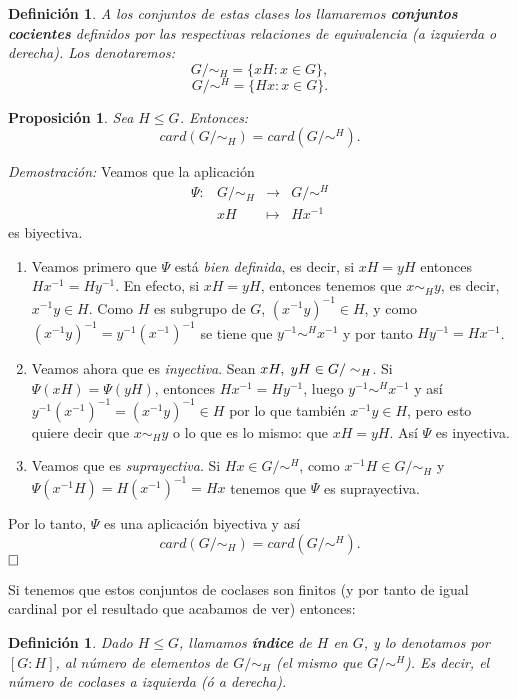 \documentclass[12pt]{article}
\newtheorem{proposition}[theorem]{Proposición}
\newtheorem{definition}[theorem]{Definición}
\begin{document}
\begin{definition}A los conjuntos de estas clases los llamaremos \textbf{conjuntos cocientes} definidos por las respectivas relaciones de equivalencia (a izquierda o derecha). Los denotaremos: $$G/\sim_{H} = \lbrace xH : x \in G \rbrace,$$ $$G/\sim^{H} = \lbrace Hx : x \in G \rbrace.$$
\end{definition}

\begin{proposition}
Sea $H \leq G$. Entonces:
$$card(G/\sim_{H})= card(G/\sim^{H}).$$
\end{proposition}
\emph{Demostración: } Veamos que la aplicación
$$
\begin{array}{rccl}
\Psi \colon &G/\sim_{H} & \longrightarrow & G/\sim^{H}\\
&xH & \longmapsto &Hx^{-1}
\end{array}
$$
es biyectiva. \begin{enumerate} 
\item Veamos primero que $\Psi$ está \textit{bien definida}, es decir, si $xH = yH$ entonces $Hx^{-1} = Hy^{-1}$. En efecto, si $xH = yH$, entonces tenemos que $x\sim_{H} y$, es decir, $x^{-1}y \in H$. Como $H$ es subgrupo de $G$, $(x^{-1}y)^{-1} \in H$, y como $(x^{-1}y)^{-1} = y^{-1}(x^{-1})^{-1}$ se tiene que $y^{-1}\sim^{H} x^{-1}$ y por tanto $Hy^{-1} = Hx^{-1}$.
\item Veamos ahora que es \textit{inyectiva}. Sean $xH, \hspace{0.1cm} yH \in G/\sim_{H}$. Si $\Psi (xH) = \Psi (yH)$, entonces $Hx^{-1} = Hy^{-1}$, luego $y^{-1}\sim^{H} x^{-1}$ y así $y^{-1}(x^{-1})^{-1} = (x^{-1}y)^{-1} \in H$ por lo que también $x^{-1}y \in H$, pero esto quiere decir que $x \sim_{H}y$ o lo que es lo mismo: que $xH = yH$. Así $\Psi$ es inyectiva.
\item Veamos que es \textit{suprayectiva}. Si $Hx \in G/\sim^{H}$, como $x^{-1}H \in G/\sim_{H}$ y $\Psi (x^{-1}H) = H(x^{-1})^{-1} = Hx$ tenemos que $\Psi$ es suprayectiva.
\end{enumerate}
Por lo tanto, $\Psi$ es una aplicación biyectiva y así $$card(G/\sim_{H}) = card(G/\sim^{H}).$$
$\hfill \square$

Si tenemos que estos conjuntos de coclases son finitos (y por tanto de igual cardinal por el resultado que acabamos de ver) entonces:

\begin{definition}Dado $H \leq G$, llamamos \textbf{índice} de $H$ en $G$, y lo denotamos por $[G:H]$, al número de elementos de $G/\sim_{H}$ (el mismo que $G/\sim^{H}$). Es decir, el número de coclases a izquierda (ó a derecha).
\end{definition}
\end{document}
